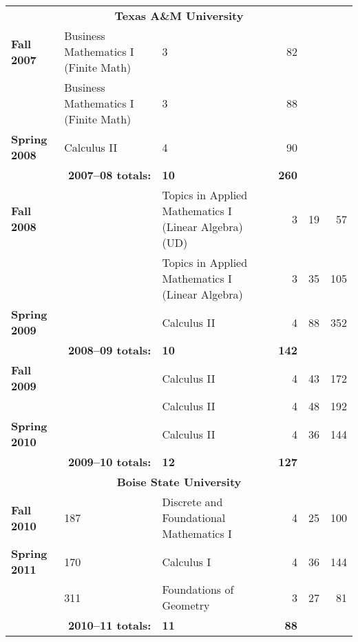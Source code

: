 \documentclass[12pt]{article}
\begin{document}
{\begin{center}
\begin{longtable}{@{} l l l rrr @{}}
\midrule

\multicolumn{6}{c}{\textbf{Texas A\&M University}} \\
\addlinespace[0.1in]

\textbf{Fall 2007} & Business Mathematics I (Finite Math) & 3 & 82 \\
 & Business Mathematics I (Finite Math) & 3 & 88 \\
\addlinespace[0.1in]

\textbf{Spring 2008} & Calculus II & 4 & 90 \\
 \cmidrule{2-4}
 & \multicolumn{1}{r}{\textbf{2007--08 totals:}} & \textbf{10} & \textbf{260} \\
 \cmidrule{2-4}

\textbf{Fall 2008} & & Topics in Applied Mathematics I (Linear Algebra) (UD) & 3 & 19 & 57 \\
 & & Topics in Applied Mathematics I (Linear Algebra) & 3 & 35 & 105 \\
\addlinespace[0.1in]

\textbf{Spring 2009} & & Calculus II & 4 & 88 & 352 \\
 \cmidrule{2-4}
 & \multicolumn{1}{r}{\textbf{2008--09 totals:}} & \textbf{10} & \textbf{142} \\
 \cmidrule{2-4}

\textbf{Fall 2009} & & Calculus II & 4 & 43 & 172 \\
 & & Calculus II & 4 & 48 & 192 \\
\addlinespace[0.1in]

\textbf{Spring 2010} & & Calculus II & 4 & 36 & 144 \\
 \cmidrule{2-4}
 & \multicolumn{1}{r}{\textbf{2009--10 totals:}} & \textbf{12} & \textbf{127} \\

\midrule

\multicolumn{6}{c}{\textbf{Boise State University}} \\
\addlinespace[0.1in]

\textbf{Fall 2010} & 187 & Discrete and Foundational Mathematics I & 4 & 25 & 100 \\
\addlinespace[0.1in]

\textbf{Spring 2011} & 170 & Calculus I & 4 & 36 & 144 \\
 & 311 & Foundations of Geometry & 3 & 27 & 81 \\
 \cmidrule{2-4}
 & \multicolumn{1}{r}{\textbf{2010--11 totals:}} & \textbf{11} & \textbf{88} \\
 \cmidrule{2-4}


\end{longtable}
\end{center}}
\end{document}
